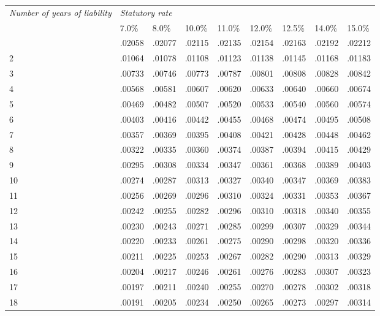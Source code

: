 \documentclass[12pt,a4paper]{article}
\begin{document}
{\footnotesize
\noindent
\begin{longtable}{p{62pt} llll llll}
\hline
\itshape Number of years of liability&\multicolumn{7}{l}{\itshape Statutory rate}\\
&7.0\%& 8.0\%&10.0\%&11.0\%&12.0\%&12.5\%&14.0\%&15.0\%\\
\hline
\endhead
\hline
\endlastfoot
1&.02058&.02077&.02115&.02135&.02154&.02163&.02192&.02212\\
2&.01064&.01078&.01108&.01123&.01138&.01145&.01168&.01183\\
3&.00733&.00746&.00773&.00787&.00801&.00808&.00828&.00842\\
4&.00568&.00581&.00607&.00620&.00633&.00640&.00660&.00674\\
5&.00469&.00482&.00507&.00520&.00533&.00540&.00560&.00574\\
6&.00403&.00416&.00442&.00455&.00468&.00474&.00495&.00508\\
7&.00357&.00369&.00395&.00408&.00421&.00428&.00448&.00462\\
8&.00322&.00335&.00360&.00374&.00387&.00394&.00415&.00429\\
9&.00295&.00308&.00334&.00347&.00361&.00368&.00389&.00403\\
10&.00274&.00287&.00313&.00327&.00340&.00347&.00369&.00383\\
11&.00256&.00269&.00296&.00310&.00324&.00331&.00353&.00367\\
12&.00242&.00255&.00282&.00296&.00310&.00318&.00340&.00355\\
13&.00230&.00243&.00271&.00285&.00299&.00307&.00329&.00344\\
14&.00220&.00233&.00261&.00275&.00290&.00298&.00320&.00336\\
15&.00211&.00225&.00253&.00267&.00282&.00290&.00313&.00329\\
16&.00204&.00217&.00246&.00261&.00276&.00283&.00307&.00323\\
17&.00197&.00211&.00240&.00255&.00270&.00278&.00302&.00318\\
18&.00191&.00205&.00234&.00250&.00265&.00273&.00297&.00314\\
\end{longtable}

}

\end{document}
